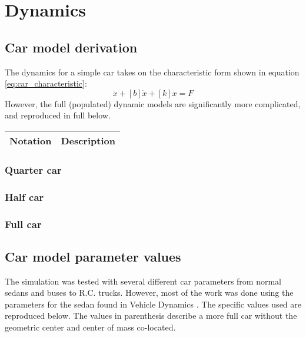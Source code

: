 \chapter{Dynamics}

\section{Car model derivation}
\label{a:dynamics}
The dynamics for a simple car takes on the characteristic form shown in equation \eqref{eq:car_characteristic}:
\begin{equation}
[M]\ddot{x}+[b]\dot{x}+[k]x=F
\end{equation}
However, the full (populated) dynamic models are significantly more complicated, and reproduced in full below.

\begin{center}
\begin{tabular}{| l | c |}
\hline
Notation & Description \\
\hline

\hline
\end{tabular}
\end{center}

\subsection{Quarter car}



\subsection{Half car}



\subsection{Full car}



\section{Car model parameter values}
The simulation was tested with several different car parameters from normal sedans and buses to R.C. trucks. However, most of the work was done using the parameters for the sedan found in Vehicle Dynamics \cite{book:jazar}. The specific values used are reproduced below. The values in parenthesis describe a more full car without the geometric center and center of mass co-located.


